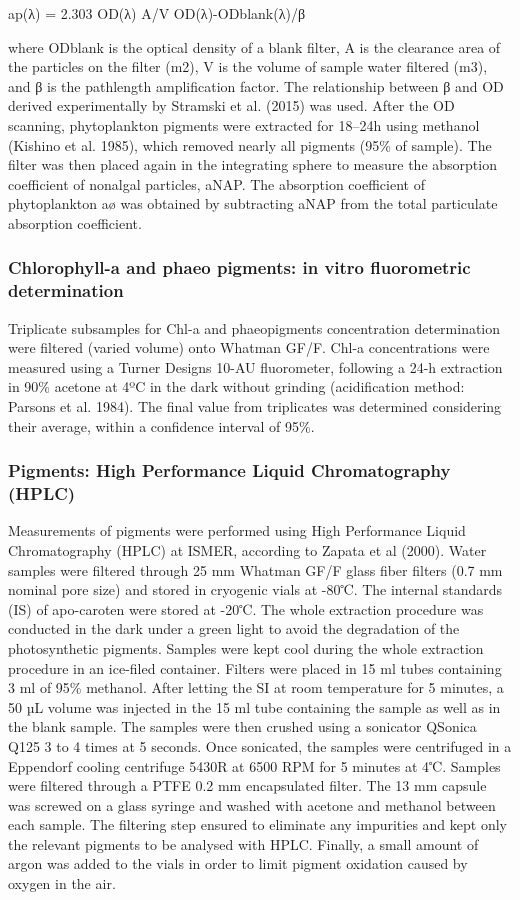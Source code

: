 \documentclass[essd, manuscript]{copernicus}
\begin{document}
ap(λ) = 2.303 OD(λ) A/V OD(λ)-ODblank(λ)/β

where ODblank is the optical density of a blank filter, A is the clearance area of the particles on the filter (m2), V is the volume of sample water filtered (m3), and β is the pathlength amplification factor. The relationship between β and OD derived experimentally by Stramski et al. (2015) was used. After the OD scanning, phytoplankton pigments were extracted for 18–24h using methanol (Kishino et al. 1985), which removed nearly all pigments (95\% of sample). The filter was then placed again in the integrating sphere to measure the absorption coefficient of nonalgal particles, aNAP. The absorption coefficient of phytoplankton aø was obtained by subtracting aNAP from the total particulate absorption coefficient.

\subsubsection{ Chlorophyll-a and phaeo pigments: in vitro fluorometric determination}
Triplicate subsamples for Chl-a and phaeopigments concentration determination were filtered (varied volume) onto Whatman GF/F. Chl-a concentrations were measured using a Turner Designs 10-AU fluorometer, following a 24-h extraction in 90\% acetone at 4ºC in the dark without grinding (acidification method: Parsons et al. 1984). The final value from triplicates was determined considering their average, within a confidence interval of 95\%.

\subsubsection{Pigments: High Performance Liquid Chromatography (HPLC)}
Measurements of pigments were performed using High Performance Liquid Chromatography (HPLC) at ISMER, according to Zapata et al (2000). Water samples were filtered through 25 mm Whatman GF/F glass fiber filters (0.7 mm nominal pore size) and stored in cryogenic vials at -80℃. The internal standards (IS) of apo-caroten were stored at -20℃. The whole extraction procedure was conducted in the dark under a green light to avoid the degradation of the photosynthetic pigments. Samples were kept cool during the whole extraction procedure in an ice-filed container. Filters were placed in 15 ml tubes containing 3 ml of 95\% methanol. After letting the SI at room temperature for 5 minutes, a 50 µL volume was injected in the 15 ml tube containing the sample as well as in the blank sample. The samples were then crushed using a sonicator QSonica Q125 3 to 4 times at 5 seconds.  Once sonicated, the samples were centrifuged in a Eppendorf cooling centrifuge 5430R at 6500 RPM for 5 minutes at 4℃. Samples were filtered through a PTFE 0.2 mm encapsulated filter. The 13 mm capsule was screwed on a glass syringe and washed with acetone and methanol between each sample. The filtering step ensured to eliminate any impurities and kept only the relevant pigments to be analysed with HPLC. Finally, a small amount of argon was added to the vials in order to limit pigment oxidation caused by oxygen in the air.
 
\end{document}
